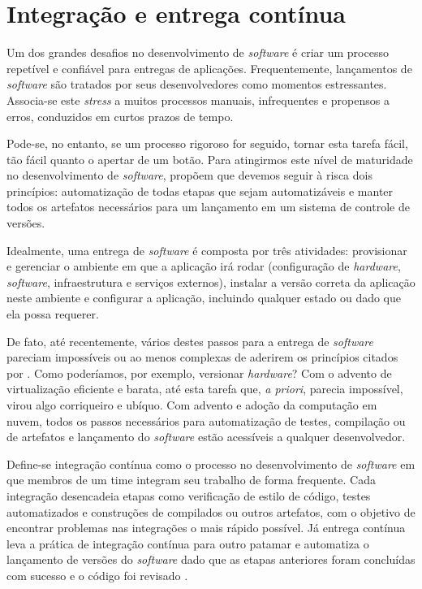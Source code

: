   \section{Integração e entrega contínua}
  Um dos grandes desafios no desenvolvimento de \emph{software} é criar um processo repetível e 
  confiável para entregas de aplicações. Frequentemente, lançamentos de \emph{software} são
  tratados por seus desenvolvedores como momentos estressantes. Associa-se este \emph{stress} a
  muitos processos manuais, infrequentes e propensos a erros, conduzidos em curtos prazos 
  de tempo.
  
  Pode-se, no entanto, se um processo rigoroso for seguido,  
  tornar esta tarefa fácil, tão fácil quanto o apertar de um botão.
  Para atingirmos este nível de maturidade no desenvolvimento de 
  \emph{software},  propõem que
  devemos seguir à risca dois princípios: automatização de todas etapas que sejam 
  automatizáveis e manter todos os artefatos necessários para um lançamento em um sistema de 
  controle de versões. 

  Idealmente, uma entrega de \emph{software} é composta por três atividades: 
  provisionar e gerenciar o ambiente em que a aplicação irá rodar (configuração de \emph{hardware},
  \emph{software}, infraestrutura e serviços externos), instalar a versão correta da aplicação 
  neste ambiente e configurar a aplicação, incluindo qualquer estado ou dado que ela possa requerer.

  De fato, até recentemente, vários destes passos para a entrega de \emph{software} pareciam 
  impossíveis ou ao menos complexas de aderirem os princípios citados por 
  . Como poderíamos, por exemplo, 
  versionar \emph{hardware}? Com o advento de virtualização eficiente e barata, até esta 
  tarefa que, \emph{a priori}, parecia impossível, virou algo corriqueiro e ubíquo. 
  Com advento e adoção da computação em nuvem, todos os passos necessários para automatização 
  de testes, compilação ou de artefatos e lançamento do \emph{software} estão 
  acessíveis a qualquer desenvolvedor.

  Define-se integração contínua como o processo no desenvolvimento de \emph{software} em que 
  membros de um time integram seu trabalho de forma frequente. Cada integração desencadeia etapas 
  como verificação de estilo de código, testes automatizados e construções de compilados ou 
  outros artefatos, com o objetivo de encontrar problemas nas integrações o mais rápido possível.
  Já entrega contínua leva a prática de integração contínua para outro patamar e automatiza 
  o lançamento de versões do \emph{software} dado que as etapas anteriores foram concluídas com 
  sucesso e o código foi revisado \cite{fowler2006continuous}.
